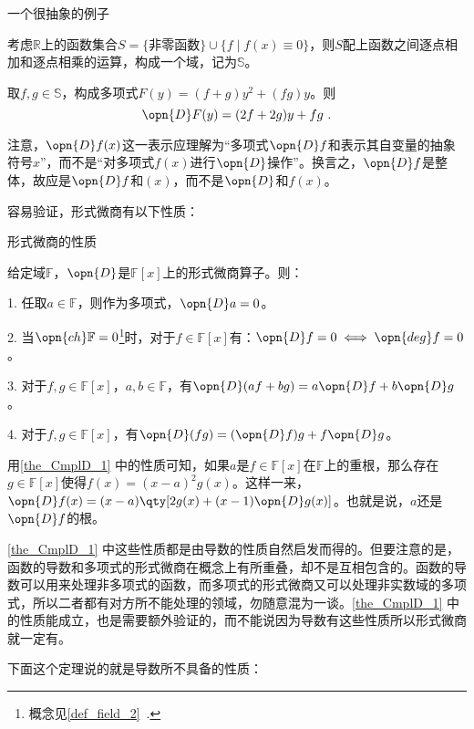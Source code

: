 \begin{example}{一个很抽象的例子}

考虑$\mathbb{R}$上的函数集合$S=\{\text{非零函数}\}\cup\{f\mid f(x)\equiv 0\}$，则$S$配上函数之间逐点相加和逐点相乘的运算，构成一个域，记为$\mathbb{S}$。

取$f, g\in\mathbb{S}$，构成多项式$F(y)=(f+g)y^2+(fg)y$。则
\begin{equation}
\opn{D}F(y) = (2f+2g)y+fg~.
\end{equation}

\end{example}

注意，$\opn{D}f(x)$这一表示应理解为“多项式$\opn{D}f$和表示其自变量的抽象符号$x$”，而不是“对多项式$f(x)$进行$\opn{D}$操作”。换言之，$\opn{D}f$是整体，故应是$\opn{D}f$和$(x)$，而不是$\opn{D}$和$f(x)$。

容易验证，形式微商有以下性质：

\begin{theorem}{形式微商的性质}\label{the_CmplD_1}

给定域$\mathbb{F}$，$\opn{D}$是$\mathbb{F}[x]$上的形式微商算子。则：

1. 任取$a\in\mathbb{F}$，则作为多项式，$\opn{D}a=0$。

2. 当$\opn{ch}\mathbb{F}=0$\footnote{概念见\autoref{def_field_2}~. }时，对于$f\in\mathbb{F}[x]$有：$\opn{D}f=0 \iff \opn{deg}f=0$。

3. 对于$f, g\in\mathbb{F}[x]$，$a, b\in\mathbb{F}$，有$\opn{D}(af+bg)=a\opn{D}f+b\opn{D}g$。

4. 对于$f, g\in\mathbb{F}[x]$，有$\opn{D}(fg) = (\opn{D}f)g+f\opn{D}g$。

\end{theorem}

用\autoref{the_CmplD_1} 中的性质可知，如果$a$是$f\in\mathbb{F}[x]$在$\mathbb{F}$上的重根，那么存在$g\in\mathbb{F}[x]$使得$f(x)=(x-a)^2g(x)$。这样一来，$\opn{D}f(x)=(x-a)\qty[2g(x)+(x-1)\opn{D}g(x)]$。也就是说，$a$还是$\opn{D}f$的根。

\autoref{the_CmplD_1} 中这些性质都是由导数的性质自然启发而得的。但要注意的是，函数的导数和多项式的形式微商在概念上有所重叠，却不是互相包含的。函数的导数可以用来处理非多项式的函数，而多项式的形式微商又可以处理非实数域的多项式，所以二者都有对方所不能处理的领域，勿随意混为一谈。\autoref{the_CmplD_1} 中的性质能成立，也是需要额外验证的，而不能说因为导数有这些性质所以形式微商就一定有。

下面这个定理说的就是导数所不具备的性质：

